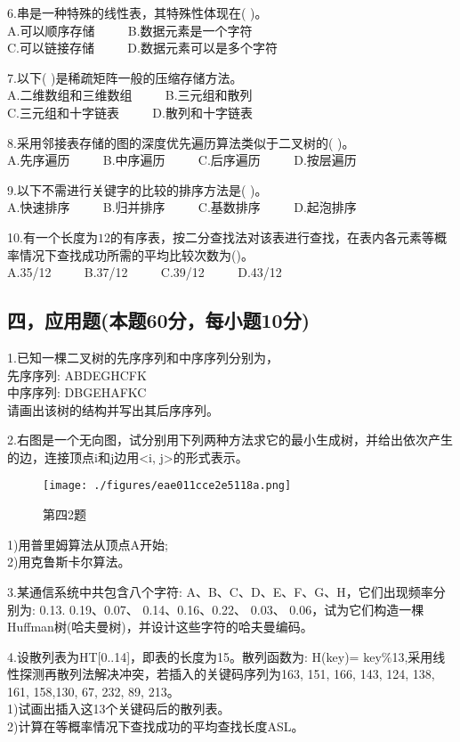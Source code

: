 6.串是一种特殊的线性表，其特殊性体现在( )。 \\
A.可以顺序存储 $\qquad$ B.数据元素是一个字符 \\
C.可以链接存储 $\qquad$ D.数据元素可以是多个字符

7.以下( )是稀疏矩阵一般的压缩存储方法。 \\
A.二维数组和三维数组 $\qquad$ B.三元组和散列 \\
C.三元组和十字链表 $\qquad$ D.散列和十字链表

8.采用邻接表存储的图的深度优先遍历算法类似于二叉树的( )。 \\
A.先序遍历 $\qquad$ B.中序遍历 $\qquad$ C.后序遍历 $\qquad$ D.按层遍历

9.以下不需进行关键字的比较的排序方法是(  )。 \\
A.快速排序 $\qquad$ B.归并排序 $\qquad$ C.基数排序 $\qquad$ D.起泡排序

10.有一个长度为$12$的有序表，按二分查找法对该表进行查找，在表内各元素等概率情况下查找成功所需的平均比较次数为()。 \\
A.35/12 $\qquad$ B.37/12 $\qquad$ C.39/12 $\qquad$ D.43/12

\subsection{四，应用题(本题60分，每小题10分)}

1.已知一棵二叉树的先序序列和中序序列分别为， \\
先序序列: ABDEGHCFK \\
中序序列: DBGEHAFKC \\
请画出该树的结构并写出其后序序列。

2.右图是一个无向图，试分别用下列两种方法求它的最小生成树，并给出依次产生的边，连接顶点i和j边用<i, j>的形式表示。
\begin{figure}[ht]
\centering
\texttt{[image: ./figures/eae011cce2e5118a.png]}
\caption{第四2题} \label{fig_SMDS14_1}
\end{figure}
1)用普里姆算法从顶点A开始; \\
2)用克鲁斯卡尔算法。

3.某通信系统中共包含八个字符: A、B、C、D、E、F、G、H，它们出现频率分别为: 0.13. 0.19、0.07、 0.14、0.16、0.22、 0.03、 0.06，试为它们构造一棵Huffman树(哈夫曼树)，并设计这些字符的哈夫曼编码。

4.设散列表为HT[0..14]，即表的长度为15。散列函数为: H(key)= key\%13,采用线性探测再散列法解决冲突，若插入的关键码序列为{163, 151, 166, 143, 124, 138, 161, 158,130, 67, 232, 89, 213}。 \\
1)试画出插入这13个关键码后的散列表。 \\
2)计算在等概率情况下查找成功的平均查找长度ASL。

